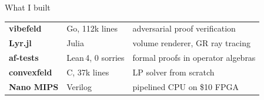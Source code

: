 \documentclass[aspectratio=169, 14pt]{beamer}
\begin{document}




\begin{frame}{What I built}
  \vfill
  \centering
  \renewcommand{\arraystretch}{1.4}
  {\fontsize{14}{19}\selectfont
  \begin{tabular}{l@{\hspace{1.2em}}l@{\hspace{1.2em}}l}
    \textbf{\color{tjo@darkteal}vibefeld}
      & Go, 112k lines
      & adversarial proof verification \\
    \textbf{\color{tjo@darkteal}Lyr.jl}
      & Julia
      & volume renderer, GR ray tracing \\
    \textbf{\color{tjo@darkteal}af-tests}
      & Lean\,4, 0 sorries
      & formal proofs in operator algebras \\
    \textbf{\color{tjo@darkteal}convexfeld}
      & C, 37k lines
      & LP solver from scratch \\
    \textbf{\color{tjo@darkteal}Nano MIPS}
      & Verilog
      & pipelined CPU on \$10 FPGA \\
  \end{tabular}
  }
  \vfill
\end{frame}
\end{document}
